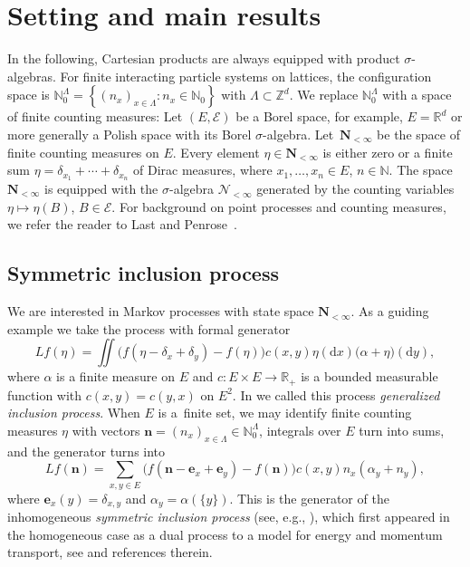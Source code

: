 \documentclass[11pt]{article}
\numberwithin{equation}{section}
\numberwithin{equation}{section}
\newcommand{\N}{\mathbb{N}}
\newcommand{\R}{\mathbb{R}}
\newcommand{\Z}{\mathbb{Z}}
\newcommand{\dd}{\mathrm{d}} %
\newcommand{\vect}[1]{\boldsymbol{#1}}
\newcommand{\set}[1]{{\left \{ #1 \right \}}}
\newcommand{\1}{\mathbbm{1}}
\begin{document}
\section{Setting and main results} \label{sec:setting-results}

In the following, Cartesian products are always equipped with product $\sigma$-algebras. For finite interacting particle systems on lattices, the configuration space is $\N_0^\Lambda = \set{(n_x)_{x\in \Lambda}\colon n_x \in \N_0}$ with $\Lambda\subset\Z^d$. We replace $\N_0^\Lambda$ with a space of finite counting measures:
Let $(E,\mathcal E)$ be a Borel space, for example, $E= \R^d$ or more generally a Polish space with its Borel $\sigma$-algebra. Let~$\mathbf N_{<\infty}$ be the space of finite counting measures on $E$. Every element $\eta \in \mathbf N_{<\infty}$ is either zero or a finite sum $\eta= \delta_{x_1}+\cdots + \delta_{x_n}$ of Dirac measures, where $x_1, \ldots, x_n \in E$, $n \in \N$. The space $\mathbf N_{<\infty}$ is equipped with the $\sigma$-algebra $\mathcal N_{<\infty}$ generated by the counting variables $\eta \mapsto \eta(B)$, $B\in \mathcal E$.
For background on point processes and counting measures, we refer the reader to Last and Penrose~\cite{LastPenroseLecturesOnThePoissonProcess}.

\subsection{Symmetric inclusion process}

We are interested in Markov processes with state space $\mathbf N_{<\infty}$. As a guiding example we take the process with formal generator
\begin{equation} \label{eq:gsip}
	L f(\eta) = \iint \bigl( f(\eta-\delta_x+\delta_y)- f(\eta)\bigr) c(x,y) \eta(\dd x) \bigl( \alpha+\eta\bigr) (\dd y),
\end{equation}
where $\alpha$ is a finite measure on $E$ and $c\colon E\times E\to \R_+$ is a bounded measurable function with $c(x,y) = c(y,x)$ on $E^2$. In \cite{IntertwiningConsistent} we called this process \emph{generalized inclusion process}. When $E$ is a~finite set, we may identify finite counting measures $\eta$ with vectors $\vect n = (n_x)_{x\in \Lambda}\in \N_0^\Lambda$, integrals over $E$ turn into sums, and the generator turns into
\begin{equation} \label{eq:sip}
	Lf(\vect n) = \sum_{x,y\in E} \bigl( f(\vect n- \vect e_x+\vect e_y) - f(\vect n)\bigr) c(x,y) n_x (\alpha_y+n_y),
\end{equation}
where $\vect e_x(y) = \delta_{x,y}$ and $\alpha_y = \alpha(\{y\})$. This is the generator of the inhomogeneous \emph{symmetric inclusion process} (see, e.g., \cite[equation~(2.2)]{floreani2020orthogonal}), which first appeared in the homogeneous case as a dual process to a model for energy and momentum transport, see \cite{giardina-redig-vafayi2010} and references therein.
\end{document}
